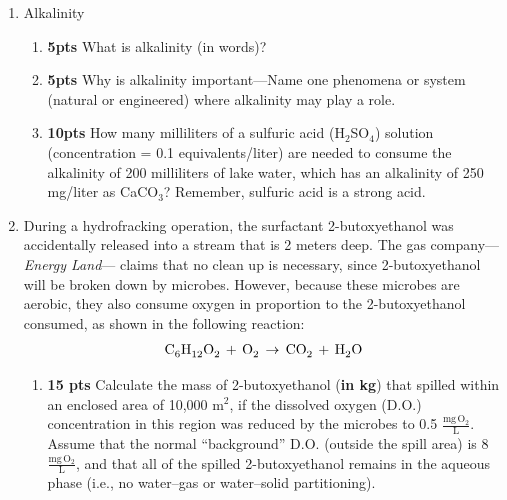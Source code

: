 \documentclass[12pt,letterpaper]{article}
\begin{document}
\begin{enumerate}

\item Alkalinity

\begin{enumerate}

\item \textbf{5pts} What is alkalinity (in words)?
\vspace{1in}

\item \textbf{5pts} Why is alkalinity important---Name one phenomena or system (natural or engineered) where alkalinity may play a role.

\vspace{1in}

\item \textbf{10pts} How many milliliters of a sulfuric acid (H$_2$SO$_4$) solution (concentration = 0.1 equivalents/liter) are needed to consume the alkalinity of 200 milliliters of lake water, which has an alkalinity of 250 mg/liter as CaCO$_3$?  Remember, sulfuric acid is a strong acid.

\vspace{4in}

\end{enumerate}



\item During a hydrofracking operation, the surfactant 2-butoxyethanol was accidentally released into a stream that is 2 meters deep.  The gas company---\emph{Energy Land}--- claims that no clean up is necessary, since 2-butoxyethanol will be broken down by microbes. However, because these microbes are aerobic, they also consume oxygen in proportion to the 2-butoxyethanol consumed, as shown in the following reaction:
\begin{align*}
\cee{C_6H_{12}O2\,  + \,  O_2\, \rightarrow \, CO_2 \, + \,  H_2O}
\end{align*}

\begin{enumerate}

\item \textbf{15 pts} Calculate the mass of 2-butoxyethanol (\textbf{in kg}) that spilled within an enclosed area of 10,000 m$^2$, if the dissolved oxygen (D.O.) concentration in this region was reduced by the microbes to 0.5 $\mathrm{\frac{mg\, O_2}{L}}$.  Assume that the normal ``background'' D.O. (outside the spill area) is 8 $\mathrm{\frac{mg\, O_2}{L}}$, and that all of the spilled 2-butoxyethanol remains in the aqueous phase (i.e., no water--gas or water--solid partitioning). 


\end{enumerate}
\end{enumerate}
\end{document}
